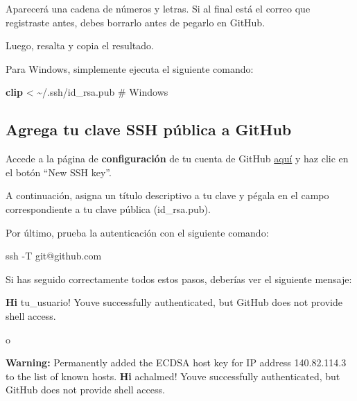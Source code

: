 \documentclass[
  letterpaper,
  DIV=11,
  numbers=noendperiod]{scrartcl}
\newenvironment{Shaded}{}{}
\newcommand{\AttributeTok}[1]{\textcolor[rgb]{0.84,0.23,0.29}{#1}}
\newcommand{\CommentTok}[1]{\textcolor[rgb]{0.42,0.45,0.49}{#1}}
\newcommand{\ExtensionTok}[1]{\textcolor[rgb]{0.84,0.23,0.29}{\textbf{#1}}}
\newcommand{\FunctionTok}[1]{\textcolor[rgb]{0.44,0.26,0.76}{#1}}
\newcommand{\NormalTok}[1]{\textcolor[rgb]{0.14,0.16,0.18}{#1}}
\newcommand{\OperatorTok}[1]{\textcolor[rgb]{0.14,0.16,0.18}{#1}}
\newcommand{\StringTok}[1]{\textcolor[rgb]{0.01,0.18,0.38}{#1}}
\begin{document}
Aparecerá una cadena de números y letras. Si al final está el correo que
registraste antes, debes borrarlo antes de pegarlo en GitHub.

Luego, resalta y copia el resultado.

Para Windows, simplemente ejecuta el siguiente comando:

\begin{Shaded}
\begin{Highlighting}[]
\ExtensionTok{clip} \OperatorTok{\textless{}}\NormalTok{ \textasciitilde{}/.ssh/id\_rsa.pub }\CommentTok{\# Windows}
\end{Highlighting}
\end{Shaded}

\hypertarget{agrega-tu-clave-ssh-puxfablica-a-github}{%
\subsection{Agrega tu clave SSH pública a
GitHub}\label{agrega-tu-clave-ssh-puxfablica-a-github}}

Accede a la página de \textbf{configuración} de tu cuenta de GitHub
\href{https://github.com/settings/keys}{aquí} y haz clic en el botón
``New SSH key''.

A continuación, asigna un título descriptivo a tu clave y pégala en el
campo correspondiente a tu clave pública (id\_rsa.pub).

Por último, prueba la autenticación con el siguiente comando:

\begin{Shaded}
\begin{Highlighting}[]
\FunctionTok{ssh} \AttributeTok{{-}T}\NormalTok{ git@github.com}
\end{Highlighting}
\end{Shaded}

Si has seguido correctamente todos estos pasos, deberías ver el
siguiente mensaje:

\begin{Shaded}
\begin{Highlighting}[]
\ExtensionTok{Hi}\NormalTok{ tu\_usuario! You}\StringTok{\textquotesingle{}ve successfully authenticated, but GitHub does not provide shell access.}
\end{Highlighting}
\end{Shaded}

o

\begin{Shaded}
\begin{Highlighting}[]
\ExtensionTok{Warning:}\NormalTok{ Permanently added the ECDSA host key for IP address }\StringTok{\textquotesingle{}140.82.114.3\textquotesingle{}}\NormalTok{ to the list of known hosts.}
\ExtensionTok{Hi}\NormalTok{ achalmed! You}\StringTok{\textquotesingle{}ve successfully authenticated, but GitHub does not provide shell access.}
\end{Highlighting}
\end{Shaded}
\end{document}

